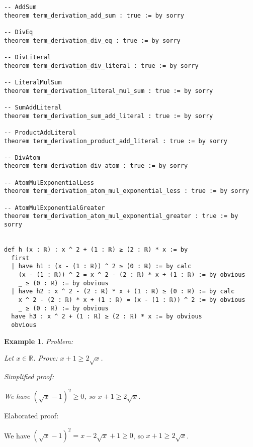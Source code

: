 \documentclass{article}
\newtheorem{example}{Example}
\begin{document}
\begin{tcolorbox}[colback=white!10, width=\linewidth]
\begin{lstlisting}[language=Lean4]
-- AddSum
theorem term_derivation_add_sum : true := by sorry

-- DivEq
theorem term_derivation_div_eq : true := by sorry

-- DivLiteral
theorem term_derivation_div_literal : true := by sorry

-- LiteralMulSum
theorem term_derivation_literal_mul_sum : true := by sorry

-- SumAddLiteral
theorem term_derivation_sum_add_literal : true := by sorry

-- ProductAddLiteral
theorem term_derivation_product_add_literal : true := by sorry

-- DivAtom
theorem term_derivation_div_atom : true := by sorry

-- AtomMulExponentialLess
theorem term_derivation_atom_mul_exponential_less : true := by sorry

-- AtomMulExponentialGreater
theorem term_derivation_atom_mul_exponential_greater : true := by sorry


def h (x : ℝ) : x ^ 2 + (1 : ℝ) ≥ (2 : ℝ) * x := by
  first
  | have h1 : (x - (1 : ℝ)) ^ 2 ≥ (0 : ℝ) := by calc
    (x - (1 : ℝ)) ^ 2 = x ^ 2 - (2 : ℝ) * x + (1 : ℝ) := by obvious
    _ ≥ (0 : ℝ) := by obvious
  | have h2 : x ^ 2 - (2 : ℝ) * x + (1 : ℝ) ≥ (0 : ℝ) := by calc
    x ^ 2 - (2 : ℝ) * x + (1 : ℝ) = (x - (1 : ℝ)) ^ 2 := by obvious
    _ ≥ (0 : ℝ) := by obvious
  have h3 : x ^ 2 + (1 : ℝ) ≥ (2 : ℝ) * x := by obvious
  obvious

\end{lstlisting}
\end{tcolorbox}


\begin{example}
Problem:
\begin{tcolorbox}[colback=yellow!10, width=\linewidth]
Let $x\in\mathbb{R}$. Prove: $x + 1 \ge 2\sqrt{x}$.
\end{tcolorbox}

Simplified proof:
\begin{tcolorbox}[colback=blue!10, width=\linewidth]
We have $(\sqrt{x}-1)^2 \ge 0$, so $x+1 \ge 2\sqrt{x}$.
\end{tcolorbox}
\end{example}

Elaborated proof:
\begin{tcolorbox}[colback=green!10, width=\linewidth]
We have $(\sqrt{x}-1)^2 = x - 2\sqrt{x} + 1 \ge 0$, so $x+1 \ge 2\sqrt{x}$.
\end{tcolorbox}
\end{document}
